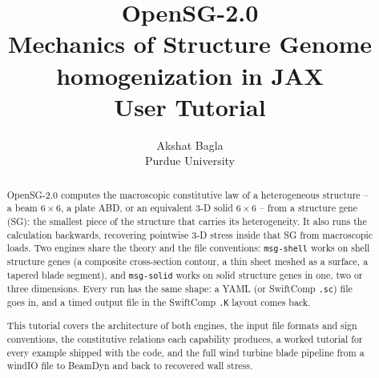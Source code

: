 \documentclass[11pt,letterpaper,oneside]{report}
\title{\vspace{-1.5cm}\Huge\bfseries OpenSG-2.0\\[0.35cm]
       \Large Mechanics of Structure Genome homogenization in JAX\\[0.2cm]
       \Large User Tutorial}
\author{Akshat Bagla \\ Purdue University}
\date{}
\begin{document}
\maketitle

\begin{abstract}
\noindent
OpenSG-2.0 computes the macroscopic constitutive law of a heterogeneous
structure -- a beam $6\times6$, a plate ABD, or an equivalent 3-D solid
$6\times6$ -- from a structure gene (SG): the smallest piece of the
structure that carries its heterogeneity. It also runs the calculation
backwards, recovering pointwise 3-D stress inside that SG from macroscopic
loads. Two engines share the theory and the file conventions: \texttt{msg-shell}
works on shell structure genes (a composite cross-section contour, a thin
sheet meshed as a surface, a tapered blade segment), and \texttt{msg-solid}
works on solid structure genes in one, two or three dimensions. Every run has
the same shape: a YAML (or SwiftComp \texttt{.sc}) file goes in, and a timed
output file in the SwiftComp \texttt{.K} layout comes back.

This tutorial covers the architecture of both engines, the input file formats
and sign conventions, the constitutive relations each capability produces, a
worked tutorial for every example shipped with the code, and the full wind
turbine blade pipeline from a windIO file to BeamDyn and back to recovered
wall stress.
\end{abstract}

\tableofcontents







\end{document}
